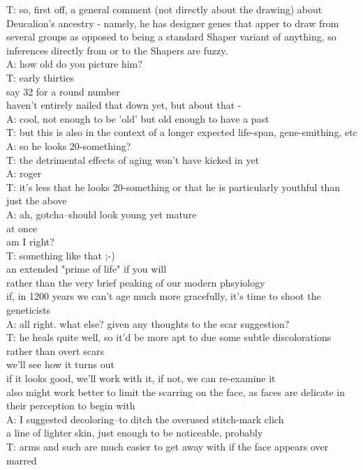 T: so, first off, a general comment (not directly about the drawing) about Deucalion's ancestry - namely, he has designer genes that apper to draw from several groups as opposed to being a standard Shaper variant of anything, so inferences directly from or to the Shapers are fuzzy.\\
A: how old do you picture him?\\
T: early thirties\\
say 32 for a round number\\
haven't entirely nailed that down yet, but about that -\\
A: cool, not enough to be 'old' but old enough to have a past\\
T: but this is also in the context of a longer expected life-span, gene-smithing, etc\\
A: so he looks 20-something?\\
T: the detrimental effects of aging won't have kicked in yet\\
A: roger\\
T: it's less that he looks 20-something or that he is particularly youthful than just the above \\
A: ah, gotcha--should look young yet mature\\
at once\\
am I right?\\
T: something like that ;-)\\
an extended "prime of life" if you will\\
rather than the very brief peaking of our modern phsyiology\\
if, in 1200 years we can't age much more gracefully, it's time to shoot the geneticists\\
A: all right. what else? given any thoughts to the scar suggestion?\\
T: he heals quite well, so it'd be more apt to due some subtle discolorations rather than overt scars\\
we'll see how it turns out\\
if it looks good, we'll work with it, if not, we can re-examine it\\
also might work better to limit the scarring on the face, as faces are delicate in their perception to begin with\\
A: I suggested decoloring--to ditch the overused stitch-mark clich\\
a line of lighter skin, just enough to be noticeable, probably\\
T: arms and such are much easier to get away with if the face appears over marred\\
